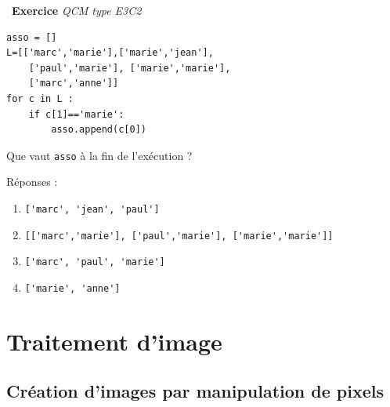 \documentclass[a4paper, french, 12pt]{article}
\newcounter{exo}
\newenvironment{exercice}[1]
{\par \medskip   \addtocounter{exo}{1} \noindent  
\begin{bclogo}[arrondi =0.1,   noborder = true, logo=\bccrayon, marge=4]{~\textbf{Exercice} \textbf{\theexo} {\itshape #1} }  \par}
{
\end{bclogo}
 \par \bigskip }
\begin{document}
\begin{exercice}{QCM type E3C2}
\begin{enumerate}
\begin{lstlisting}[style=rond]
asso = []
L=[['marc','marie'],['marie','jean'],
    ['paul','marie'], ['marie','marie'],
    ['marc','anne']]
for c in L :
    if c[1]=='marie':
        asso.append(c[0])
\end{lstlisting}

Que vaut \texttt{asso} à la fin de l'exécution ?

Réponses :

\begin{enumerate}
\item   \lstinline!['marc', 'jean', 'paul']!
\item \lstinline![['marc','marie'], ['paul','marie'], ['marie','marie']]!
\item \lstinline!['marc', 'paul', 'marie']!
\item \lstinline!['marie', 'anne']!
\end{enumerate}

\end{enumerate}
\end{exercice}

\vspace*{-20pt}

\section{Traitement d'image}

\subsection{Création d'images par manipulation de pixels}


\vspace*{-20pt}
\end{document}
